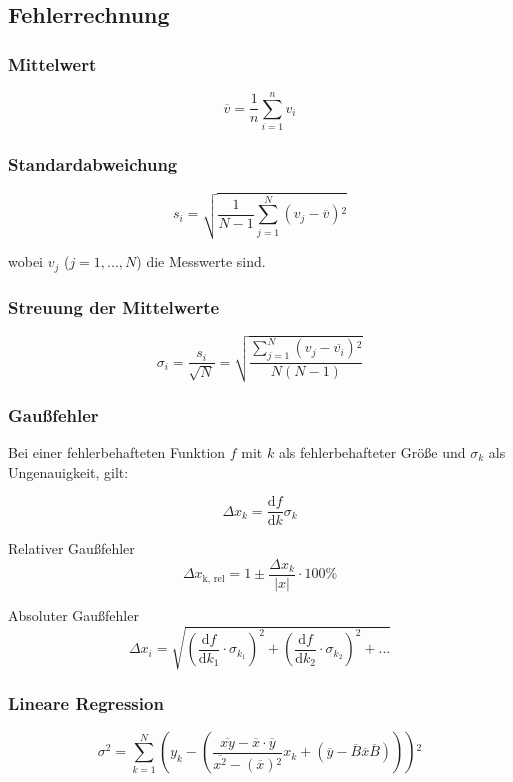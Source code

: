 \subsection{Fehlerrechnung}
\label{subsec:fehlerrechnung}

\subsubsection{Mittelwert}
\begin{equation}
\overline{v} = \frac{1}{n} \sum_{i=1}^n v_i
\end{equation}

\subsubsection{Standardabweichung}
\begin{equation}
s_i = \sqrt{\frac{1}{N - 1} \sum_{j=1}^N \left(v_j - \overline{v}\right){^2}}
\end{equation}

wobei $v_j$ ($j = 1, ..., N$) die Messwerte sind.

\subsubsection{Streuung der Mittelwerte}
\begin{equation}
\sigma_i = \frac{s_i}{\sqrt{N}} = \sqrt{\frac{\sum_{j=1}^N \left(v_j - \overline{v_i}\right){^2}}{N \left(N - 1 \right)}}
\end{equation}

\subsubsection{Gaußfehler}
Bei einer fehlerbehafteten Funktion $f$ mit $k$ als fehlerbehafteter Größe und $\sigma_k$ als Ungenauigkeit, gilt:

\begin{equation}
\Delta x_k = \frac{\mathrm{d}f}{\mathrm{d}k}\sigma_k
\end{equation}

Relativer Gaußfehler
\begin{equation}
\Delta x_\text{k, rel} = 1 \pm \frac{\Delta x_k}{|x|}\cdot 100\%
\end{equation}

Absoluter Gaußfehler
\begin{equation}
\Delta x_i = \sqrt{\left(\frac{\mathrm{d}f}{\mathrm{d}k_{1}}\cdot \sigma_{k_{1}}\right)^2 + \left(\frac{\mathrm{d}f}{\mathrm{d}k_{2}}\cdot \sigma_{k_{2}}\right)^2 + ...}
\end{equation}

\subsubsection{Lineare Regression}
\begin{equation}
\sigma {^2} = \sum_{k=1}^{N} \left(y_k - \left(\frac{\overline{xy} - \overline{x}\cdot\overline{y}}{\overline{x^2} - (\overline{x}){^2}}x_k + \left(\overline{y} - \overline{B}\overline{x}\overline{B}\right)\right)\right){^2}
\end{equation}
